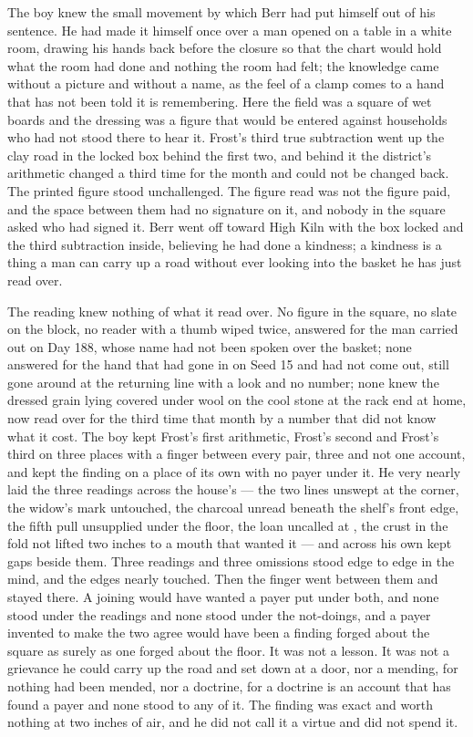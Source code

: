 The boy knew the small movement by which Berr had put himself out of his sentence. He had made it himself once over a man opened on a table in a white room, drawing his hands back before the closure so that the chart would hold what the room had done and nothing the room had felt; the knowledge came without a picture and without a name, as the feel of a clamp comes to a hand that has not been told it is remembering. Here the field was a square of wet boards and the dressing was a figure that would be entered against households who had not stood there to hear it. Frost's third true subtraction went up the clay road in the locked box behind the first two, and behind it the district's arithmetic changed a third time for the month and could not be changed back. The printed figure stood unchallenged. The figure read was not the figure paid, and the space between them had no signature on it, and nobody in the square asked who had signed it. Berr went off toward High Kiln with the box locked and the third subtraction inside, believing he had done a kindness; a kindness is a thing a man can carry up a road without ever looking into the basket he has just read over.

The reading knew nothing of what it read over. No figure in the square, no slate on the block, no reader with a thumb wiped twice, answered for the man carried out on Day 188, whose name had not been spoken over the basket; none answered for the hand that had gone in on Seed 15 and had not come out, still gone around at the returning line with a look and no number; none knew the dressed grain lying covered under wool on the cool stone at the rack end at home, now read over for the third time that month by a number that did not know what it cost. The boy kept Frost's first arithmetic, Frost's second and Frost's third on three places with a finger between every pair, three and not one account, and kept the finding on a place of its own with no payer under it. He very nearly laid the three readings across the house's  --- the two lines unswept at the corner, the widow's mark untouched, the charcoal unread beneath the shelf's front edge, the fifth pull unsupplied under the floor, the loan uncalled at , the crust in the fold not lifted two inches to a mouth that wanted it --- and across his own kept gaps beside them. Three readings and three omissions stood edge to edge in the mind, and the edges nearly touched. Then the finger went between them and stayed there. A joining would have wanted a payer put under both, and none stood under the readings and none stood under the not-doings, and a payer invented to make the two agree would have been a finding forged about the square as surely as one forged about the floor. It was not a lesson. It was not a grievance he could carry up the road and set down at a door, nor a mending, for nothing had been mended, nor a doctrine, for a doctrine is an account that has found a payer and none stood to any of it. The finding was exact and worth nothing at two inches of air, and he did not call it a virtue and did not spend it.

